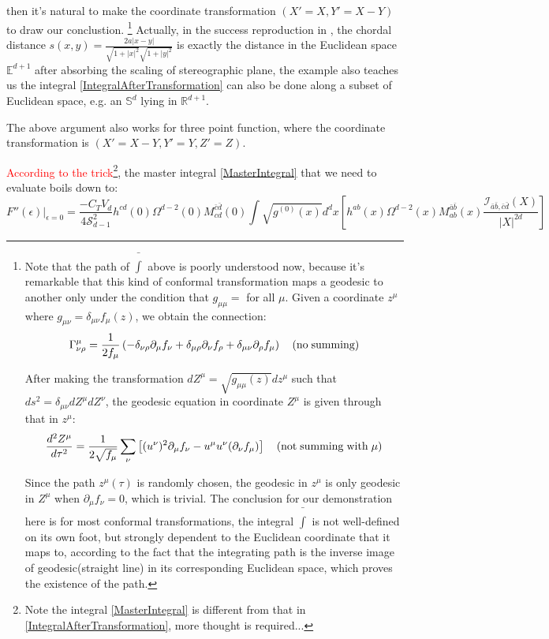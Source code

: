 \documentclass[12pt, a4paper]{article}
\numberwithin{equation}{section}
\newcommand{\be}{\begin{equation}}
\newcommand{\ee}{\end{equation}}
\newcommand{\cS}{\mathcal{S}}
\newcommand{\cI}{\mathcal{I}}
\begin{document}
	then it's natural to make the coordinate transformation $(X' = X, Y' = X - Y)$ to draw our conclustion. \footnote{Note that the path of $\bar{\int}$ above is poorly understood now, because it's remarkable that this kind of conformal transformation maps a geodesic to another only under the condition that $g_{\mu\mu} = $ for all $\mu$. Given a coordinate $z^\mu$ where $g_{\mu\nu} = \delta_{\mu\nu}f_\mu(z)$, we obtain the connection:
\be
	\Gamma_{\nu\rho}^\mu = \frac{1}{2f_\mu}\left(-\delta_{\nu\rho}\partial_\mu f_\nu + \delta_{\mu\rho}\partial_\nu f_\rho + \delta_{\mu\nu}\partial_\rho f_\mu\right)\quad {\rm (no\;summing)}
\ee
	
	After making the transformation $dZ^\mu = \sqrt{g_{\mu\mu}(z)} dz^\mu$ such that $ds^2 = \delta_{\mu\nu}dZ^\mu dZ^\nu$, the geodesic equation in coordinate $Z^\mu$ is given through that in $z^\mu$:
\be
	\frac{d^2Z^\mu}{d\tau^2} = \frac{1}{2\sqrt{f_\mu}}\sum_\nu\left[(u^\nu)^2 \partial_\mu f_\nu - u^\mu u^\nu (\partial_\nu f_\mu)\right]\quad {\rm (not\;summing \;with \;\mu)}
\ee

	Since the path $z^\mu(\tau)$ is randomly chosen, the geodesic in $z^\mu$ is only geodesic in $Z^\mu$ when $\partial_\mu f_\nu = 0$, which is trivial. The conclusion for our demonstration here is for most conformal transformations, the integral $\bar\int$ is not well-defined on its own foot, but strongly dependent to the Euclidean coordinate that it maps to, according to the fact that the integrating path is the inverse image of geodesic(straight line) in its corresponding Euclidean space, which proves the existence of the path. } Actually, in the success reproduction in \cite{Klebanov:2011fs}, the chordal distance $s(x,y) = \frac{2a|x-y|}{\sqrt{1+|x|^2}\sqrt{1+|y|^2}}$ is exactly the distance in the Euclidean space $\mathbb{E}^{d+1}$ after absorbing the scaling of stereographic plane, the example also teaches us the integral \ref{IntegralAfterTransformation} can also be done along a subset of Euclidean space, e.g. an $\mathbb{S}^d$ lying in $\mathbb{R}^{d+1}$. 

	The above argument also works for three point function, where the coordinate transformation is $(X' = X - Y, Y' = Y, Z' = Z)$.
	
	\textcolor{red}{According to the trick}\footnote{Note the integral \ref{MasterIntegral} is different from that in \ref{IntegralAfterTransformation}, more thought is required... }, the master integral \ref{MasterIntegral} that we need to evaluate boils down to:
\be
	F''(\epsilon)\Big|_{\epsilon=0} = \frac{-C_TV_d}{4\cS_{d-1}^2}h^{cd}(0)\Omega^{d-2}(0)M_{cd}^{\bar{c}\bar{d}}(0)\int\sqrt{g^{(0)}(x)}d^dx\left[h^{ab}(x)\Omega^{d-2}(x)M_{ab}^{\bar{a}\bar{b}}(x)\frac{\cI_{\bar{a}\bar{b},\bar{c}\bar{d}}(X)}{|X|^{2d}}\right]
\ee
\end{document}
